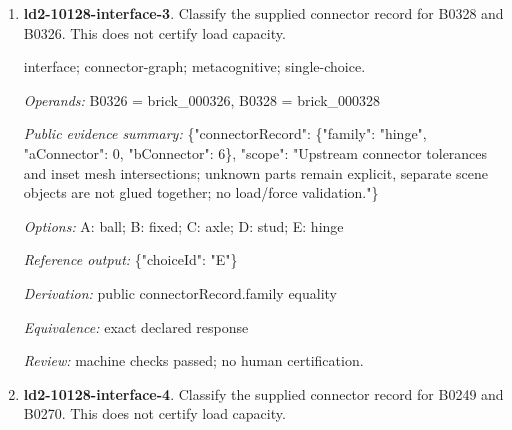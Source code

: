 \begin{enumerate}
\par{\small interface; connector-graph; metacognitive; single-choice.\par\textit{Operands:} B0327 = brick\_000327, B0326 = brick\_000326\par\textit{Public evidence summary:} \{"connectorRecord": \{"family": "fixed", "aConnector": 0, "bConnector": 2\}, "scope": "Upstream connector tolerances and inset mesh intersections; unknown parts remain explicit, separate scene objects are not glued together; no load/force validation."\}\par\textit{Options:} A: stud; B: axle; C: fixed; D: ball; E: hinge\par\textit{Reference output:} \{"choiceId": "C"\}\par\textit{Derivation:} public connectorRecord.family equality\par\textit{Equivalence:} exact declared response\par\textit{Review:} machine checks passed; no human certification.}
\item \textbf{ld2-10128-interface-3}. Classify the supplied connector record for B0328 and B0326. This does not certify load capacity.
\par{\small interface; connector-graph; metacognitive; single-choice.\par\textit{Operands:} B0326 = brick\_000326, B0328 = brick\_000328\par\textit{Public evidence summary:} \{"connectorRecord": \{"family": "hinge", "aConnector": 0, "bConnector": 6\}, "scope": "Upstream connector tolerances and inset mesh intersections; unknown parts remain explicit, separate scene objects are not glued together; no load/force validation."\}\par\textit{Options:} A: ball; B: fixed; C: axle; D: stud; E: hinge\par\textit{Reference output:} \{"choiceId": "E"\}\par\textit{Derivation:} public connectorRecord.family equality\par\textit{Equivalence:} exact declared response\par\textit{Review:} machine checks passed; no human certification.}
\item \textbf{ld2-10128-interface-4}. Classify the supplied connector record for B0249 and B0270. This does not certify load capacity.

\end{enumerate}
